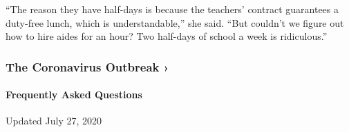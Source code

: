 ``The reason they have half-days is because the teachers' contract
guarantees a duty-free lunch, which is understandable,'' she said. ``But
couldn't we figure out how to hire aides for an hour? Two half-days of
school a week is ridiculous.''

\href{https://www.nytimes.com/news-event/coronavirus?action=click\&pgtype=Article\&state=default\&region=MAIN_CONTENT_3\&context=storylines_faq}{}

\hypertarget{the-coronavirus-outbreak-}{%
\subsubsection{The Coronavirus Outbreak
›}\label{the-coronavirus-outbreak-}}

\hypertarget{frequently-asked-questions}{%
\paragraph{Frequently Asked
Questions}\label{frequently-asked-questions}}

Updated July 27, 2020

